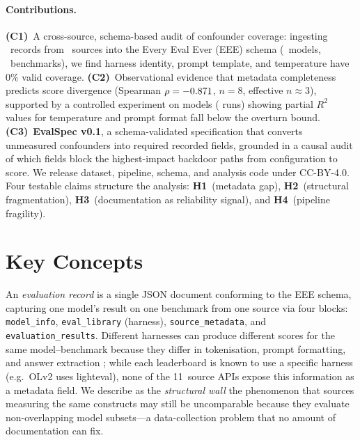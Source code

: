 \documentclass[11pt]{article}
\begin{document}
\paragraph{Contributions.}
\textbf{(C1)}~A cross-source, schema-based audit of confounder
coverage: ingesting \totalrecords{}~records from
\totalsources{}~sources into the Every Eval Ever (EEE) schema
\citep{evaleval-2026} (\totalmodels{}~models,
\totalbenchmarks{}~benchmarks), we find harness identity, prompt
template, and temperature have 0\% valid coverage.
\textbf{(C2)}~Observational evidence that metadata completeness
predicts score divergence (Spearman $\rho = -0.871{}$, $n = 8$,
effective $n \approx 3$), supported by a controlled experiment on
\expmodels{} models (\expruns{} runs) showing partial $R^2$ values
for temperature and prompt format fall below the overturn bound.
\textbf{(C3)}~\textbf{EvalSpec v0.1}, a schema-validated
specification that converts unmeasured confounders into required
recorded fields, grounded in a causal audit of which fields block
the highest-impact backdoor paths from configuration to score.
We release dataset, pipeline, schema, and analysis code under
CC-BY-4.0. Four testable claims structure the analysis:
\textbf{H1}~(metadata gap), \textbf{H2}~(structural fragmentation),
\textbf{H3}~(documentation as reliability signal), and
\textbf{H4}~(pipeline fragility).

\section{Key Concepts}\label{sec:definitions}

An \emph{evaluation record} is a single JSON document conforming
to the EEE schema, capturing one model's result on one benchmark
from one source via four blocks: \texttt{model\_info},
\texttt{eval\_library} (harness), \texttt{source\_metadata}, and
\texttt{evaluation\_results}. Different harnesses can produce
different scores for the same model--benchmark because they
differ in tokenisation, prompt formatting, and answer extraction
\citep{biderman-2024-lessons}; while each leaderboard is known to
use a specific harness (e.g.\ OLv2 uses lighteval), none of the
11~source APIs expose this information as a metadata field. We describe as the \emph{structural
wall} the phenomenon that sources measuring the same constructs
may still be uncomparable because they evaluate non-overlapping
model subsets---a data-collection problem that no amount of
documentation can fix.
\end{document}
